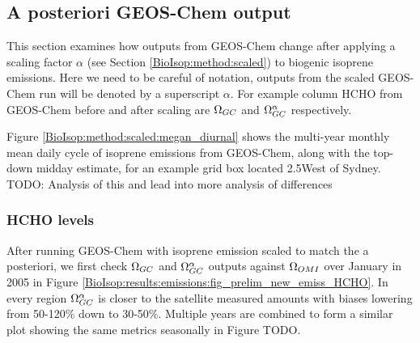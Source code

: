     
  \subsection{A posteriori GEOS-Chem output}
  \label{BioIsop:results:new_emiss}
    
    This section examines how outputs from GEOS-Chem change after applying a scaling factor $\alpha$ (see Section \ref{BioIsop:method:scaled}) to biogenic isoprene emissions.
    Here we need to be careful of notation, outputs from the scaled GEOS-Chem run will be denoted by a superscript $\alpha$.
    For example column HCHO from GEOS-Chem before and after scaling are $\Omega_{GC}$ and $\Omega_{GC}^{\alpha}$ respectively.
    
    Figure \ref{BioIsop:method:scaled:megan_diurnal} shows the multi-year monthly mean daily cycle of isoprene emissions from GEOS-Chem, along with the top-down midday estimate, for an example grid box located 2.5\degr West of Sydney.
    TODO: Analysis of this and lead into more analysis of differences
    
    
    \subsubsection{HCHO levels}
  
      After running GEOS-Chem with isoprene emission scaled to match the a posteriori, we first check $\Omega_{GC}$ and $\Omega_{GC}^{\alpha}$ outputs against $\Omega_{OMI}$ over January in 2005 in Figure \ref{BioIsop:results:emissions:fig_prelim_new_emiss_HCHO}.
      In every region $\Omega_{GC}^{\alpha}$ is closer to the satellite measured amounts with biases lowering from 50-120\% down to 30-50\%.
      Multiple years are combined to form a similar plot showing the same metrics seasonally in Figure TODO.
      

